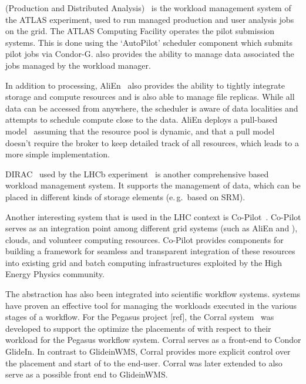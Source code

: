 \documentclass{sig-alternate}
\begin{document}
\panda (Production and Distributed Analysis)~\cite{1742-6596-331-7-072069} is
the workload management system of the ATLAS experiment, used to run managed
production and user analysis jobs on the grid. The ATLAS Computing Facility
operates the pilot submission systems. This is done using the \panda `AutoPilot'
scheduler component which submits pilot jobs via Condor-G. \panda also provides
the ability to manage data associated the jobs managed by the \panda workload
manager.

In addition to processing, AliEn~\cite{1742-6596-119-6-062012} also provides the
ability to tightly integrate storage and compute resources and is also able to
manage file replicas. While all data can be accessed from anywhere, the
scheduler is aware of data localities and attempts to schedule compute close to
the data. AliEn deploys a pull-based model~\cite{Saiz:2003:alien} assuming that
the resource pool is dynamic, and that a pull model doesn't require the broker
to keep detailed track of all resources, which leads to a more simple
implementation. 

DIRAC~\cite{1742-6596-219-6-062049} used by the LHCb experiment~\cite{lhcb} is
another comprehensive \pilot based workload management system.
It supports the management of data, which can be placed in different
kinds of storage elements (e.\,g.\ based on SRM).

Another interesting \pilot system that is used in the LHC context is
Co-Pilot~\cite{copilot-tr}. Co-Pilot serves as an integration point among
different grid \pilot systems (such as AliEn and \panda), clouds, and volunteer
computing resources. Co-Pilot provides components for building a framework for
seamless and transparent integration of these resources into existing grid and
batch computing infrastructures exploited by the High Energy Physics community.

The \pilot abstraction has also been integrated into scientific workflow
systems. \pilot systems have proven an effective tool for managing the workloads
executed in the various stages of a workflow. For the Pegasus project [ref], the
Corral system~\cite{Rynge:2011:EUG:2116259.2116599} was developed to support the
optimize the placements of \pilots with respect to their workload for the
Pegasus workflow system. Corral serves as a front-end to Condor
GlideIn. In contrast to GlideinWMS, Corral provides more explicit control over
the placement and start of \pilots to the end-user. Corral was later extended to
also serve as a possible front end to GlideinWMS.
\end{document}
